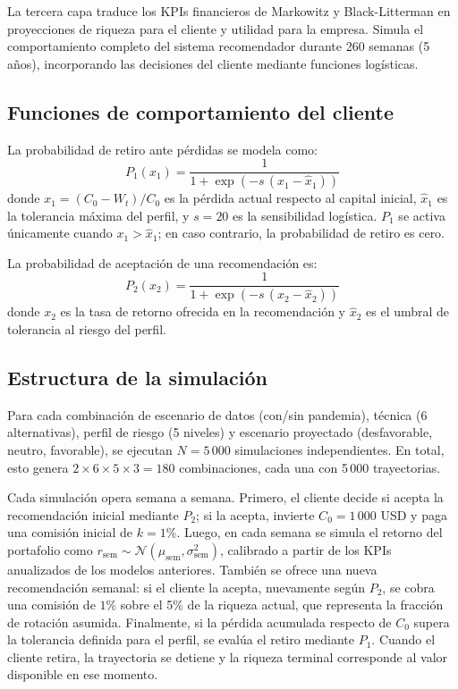 La tercera capa traduce los KPIs financieros de Markowitz y Black-Litterman en
proyecciones de riqueza para el cliente y utilidad para la empresa. Simula el
comportamiento completo del sistema recomendador durante 260 semanas (5
a\~nos), incorporando las decisiones del cliente mediante funciones
log\'isticas.

\subsection{Funciones de comportamiento del cliente}

La probabilidad de retiro ante p\'erdidas se modela como:
\begin{equation}
P_1(x_1) = \frac{1}{1 + \exp\left(-s\,(x_1 - \hat{x}_1)\right)}
\end{equation}
donde $x_1 = (C_0 - W_t) / C_0$ es la p\'erdida actual respecto al capital
inicial, $\hat{x}_1$ es la tolerancia m\'axima del perfil, y $s = 20$ es la
sensibilidad log\'istica. $P_1$ se activa \'unicamente cuando
$x_1 > \hat{x}_1$; en caso contrario, la probabilidad de retiro es cero.

La probabilidad de aceptaci\'on de una recomendaci\'on es:
\begin{equation}
P_2(x_2) = \frac{1}{1 + \exp\left(-s\,(x_2 - \hat{x}_2)\right)}
\end{equation}
donde $x_2$ es la tasa de retorno ofrecida en la recomendaci\'on y
$\hat{x}_2$ es el umbral de tolerancia al riesgo del perfil.

\subsection{Estructura de la simulaci\'on}

Para cada combinaci\'on de escenario de datos (con/sin pandemia), t\'ecnica
(6 alternativas), perfil de riesgo (5 niveles) y escenario proyectado
(desfavorable, neutro, favorable), se ejecutan $N = 5\,000$ simulaciones
independientes. En total, esto genera $2 \times 6 \times 5 \times 3 = 180$
combinaciones, cada una con 5\,000 trayectorias.

Cada simulaci\'on opera semana a semana. Primero, el cliente decide si acepta la recomendaci\'on inicial mediante $P_2$; si la acepta, invierte $C_0 = 1\,000$ USD y paga una comisi\'on inicial de $k = 1\%$. Luego, en cada semana se simula el retorno del portafolio como $r_{\text{sem}} \sim \mathcal{N}(\mu_{\text{sem}}, \sigma_{\text{sem}}^2)$, calibrado a partir de los KPIs anualizados de los modelos anteriores. Tambi\'en se ofrece una nueva recomendaci\'on semanal: si el cliente la acepta, nuevamente seg\'un $P_2$, se cobra una comisi\'on de $1\%$ sobre el 5\% de la riqueza actual, que representa la fracci\'on de rotaci\'on asumida. Finalmente, si la p\'erdida acumulada respecto de $C_0$ supera la tolerancia definida para el perfil, se eval\'ua el retiro mediante $P_1$. Cuando el cliente retira, la trayectoria se detiene y la riqueza terminal corresponde al valor disponible en ese momento.


